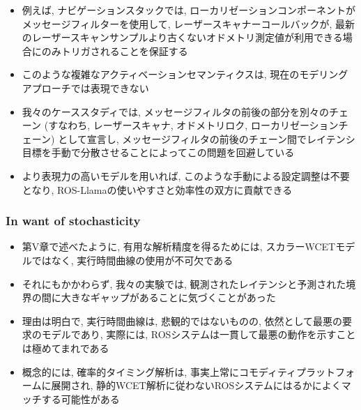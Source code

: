 \begin{frame}{}
    \begin{itemize}
        \item 例えば, ナビゲーションスタックでは, ローカリゼーションコンポーネントがメッセージフィルターを使用して, レーザースキャナーコールバックが, 最新のレーザースキャンサンプルより古くないオドメトリ測定値が利用できる場合にのみトリガされることを保証する
        \item このような複雑なアクティベーションセマンティクスは, 現在のモデリングアプローチでは表現できない
        \item 我々のケーススタディでは, メッセージフィルタの前後の部分を別々のチェーン (すなわち, レーザースキャナ, オドメトリロク, ローカリゼーションチェーン) として宣言し, メッセージフィルタの前後のチェーン間でレイテンシ目標を手動で分散させることによってこの問題を回避している
        \item より表現力の高いモデルを用いれば, このような手動による設定調整は不要となり, ROS-Llamaの使いやすさと効率性の双方に貢献できる
    \end{itemize}
\end{frame}


\subsubsection{In want of stochasticity}
\label{sssec: in want of stochasticity}

\begin{frame}{}
    \begin{itemize}
        \item 第V章で述べたように, 有用な解析精度を得るためには, スカラーWCETモデルではなく, 実行時間曲線の使用が不可欠である
        \item それにもかかわらず, 我々の実験では, 観測されたレイテンシと予測された境界の間に大きなギャップがあることに気づくことがあった
    \end{itemize}
\end{frame}

\begin{frame}{}
    \begin{itemize}
        \item 理由は明白で, 実行時間曲線は, 悲観的ではないものの, 依然として最悪の要求のモデルであり, 実際には, ROSシステムは一貫して最悪の動作を示すことは極めてまれである
        \item 概念的には, 確率的タイミング解析は, 事実上常にコモディティプラットフォームに展開され, 静的WCET解析に従わないROSシステムにはるかによくマッチする可能性がある
    \end{itemize}
\end{frame}

